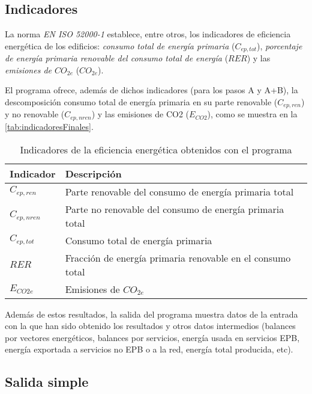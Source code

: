 \documentclass[10pt,notitlepage,oneside,a4paper]{article}
\begin{document}
\subsection{Indicadores}

La norma \textit{EN ISO 52000-1} establece, entre otros, los indicadores de eficiencia energética de los edificios: \textit{consumo total de energía primaria} (\texttt{$C_{ep,tot}$}), \textit{porcentaje de energía primaria renovable del consumo total de energía} (\texttt{$RER$}) y las \textit{emisiones de $CO_{2e}$} (\texttt{$CO_{2e}$}).

El programa ofrece, además de dichos indicadores (para los pasos A y A+B), la descomposición consumo total de energía primaria en su parte renovable (\texttt{$C_{ep,ren}$}) y no renovable (\texttt{$C_{ep,nren}$}) y las emisiones de CO2 (\texttt{$E_{CO2}$}), como se muestra en la \autoref{tab:indicadoresFinales}.

\begin{table}[H]
    \centering
    \small
    \caption{Indicadores de la eficiencia energética obtenidos con el programa}\label{tab:indicadoresFinales}
    \begin{tabular}{ll}
        \toprule
        \textbf{Indicador} & \textbf{Descripción}                                       \\
        \midrule
        $C_{ep,ren}$       & Parte renovable del consumo de energía primaria total      \\
        $C_{ep,nren}$      & Parte no renovable del consumo de energía primaria total   \\
        $C_{ep,tot}$       & Consumo total de energía primaria                          \\
        $RER$              & Fracción de energía primaria renovable en el consumo total \\
        $E_{CO2e}$         & Emisiones de $CO_{2e}$                                     \\
        \bottomrule
    \end{tabular}
\end{table}

Además de estos resultados, la salida del programa muestra datos de la entrada con la que han sido obtenido los resultados y otros datos intermedios (balances por vectores energéticos, balances por servicios, energía usada en servicios EPB, energía exportada a servicios no EPB o a la red, energía total producida, etc).

\subsection{Salida simple}
\end{document}
